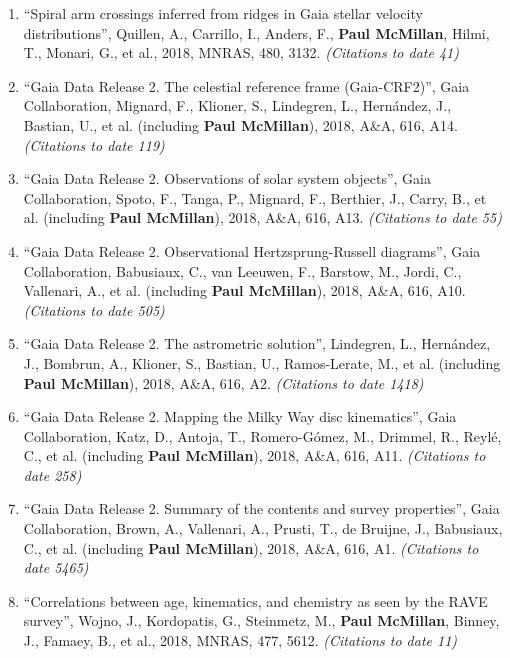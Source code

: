 \documentclass{resume}
\begin{document}
\begin{enumerate}
\item ``Spiral arm crossings inferred from ridges in Gaia stellar velocity distributions'', Quillen, A., Carrillo, I., Anders, F., \textbf{Paul McMillan}, Hilmi, T., Monari, G., et al., 2018, MNRAS, 480, 3132. \textit{(Citations to date 41)}

\item ``Gaia Data Release 2. The celestial reference frame (Gaia-CRF2)'', Gaia Collaboration, Mignard, F., Klioner, S., Lindegren, L., Hern\'andez, J., Bastian, U., et al. (including \textbf{Paul McMillan}), 2018, A\&A, 616, A14. \textit{(Citations to date 119)}

\item ``Gaia Data Release 2. Observations of solar system objects'', Gaia Collaboration, Spoto, F., Tanga, P., Mignard, F., Berthier, J., Carry, B., et al. (including \textbf{Paul McMillan}), 2018, A\&A, 616, A13. \textit{(Citations to date 55)}

\item ``Gaia Data Release 2. Observational Hertzsprung-Russell diagrams'', Gaia Collaboration, Babusiaux, C., van Leeuwen, F., Barstow, M., Jordi, C., Vallenari, A., et al. (including \textbf{Paul McMillan}), 2018, A\&A, 616, A10. \textit{(Citations to date 505)}

\item ``Gaia Data Release 2. The astrometric solution'', Lindegren, L., Hern\'andez, J., Bombrun, A., Klioner, S., Bastian, U., Ramos-Lerate, M., et al. (including \textbf{Paul McMillan}), 2018, A\&A, 616, A2. \textit{(Citations to date 1418)}

\item ``Gaia Data Release 2. Mapping the Milky Way disc kinematics'', Gaia Collaboration, Katz, D., Antoja, T., Romero-G\'omez, M., Drimmel, R., Reyl\'e, C., et al. (including \textbf{Paul McMillan}), 2018, A\&A, 616, A11. \textit{(Citations to date 258)}

\item ``Gaia Data Release 2. Summary of the contents and survey properties'', Gaia Collaboration, Brown, A., Vallenari, A., Prusti, T., de Bruijne, J., Babusiaux, C., et al. (including \textbf{Paul McMillan}), 2018, A\&A, 616, A1. \textit{(Citations to date 5465)}

\item ``Correlations between age, kinematics, and chemistry as seen by the RAVE survey'', Wojno, J., Kordopatis, G., Steinmetz, M., \textbf{Paul McMillan}, Binney, J., Famaey, B., et al., 2018, MNRAS, 477, 5612. \textit{(Citations to date 11)}


\end{enumerate}
\end{document}
